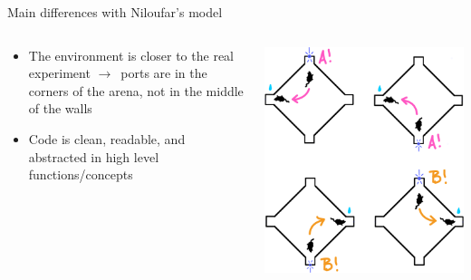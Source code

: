 \documentclass[bigger]{beamer}
\begin{document}
\begin{frame}[label={sec:org1eefb35}]{Main differences with Niloufar's model}
\begin{columns}
\begin{column}{0.7\columnwidth}
\begin{itemize}
\item The environment is \alert{closer to the real experiment} \(\to\)~ports are in the corners of the arena, not in the middle of the walls
\item Code is clean, readable, and abstracted in high level functions/concepts
\end{itemize}
\end{column}
\begin{column}{0.3\columnwidth}
\begin{center}
\includegraphics[width=\textwidth]{img/task.png}
\end{center}
\begin{center}

\end{center}
\end{column}
\end{columns}
\end{frame}
\end{document}
